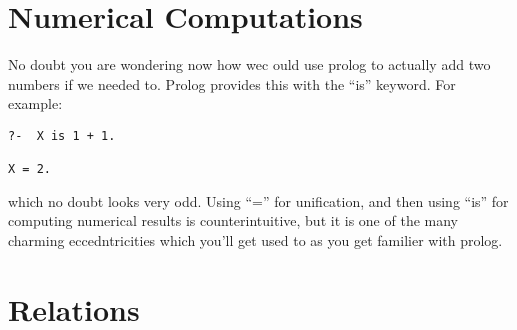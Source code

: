 \documentclass{book}[9pt]
\begin{document}
\section{Numerical Computations}

No doubt you are wondering now how wec ould use prolog to actually add
two numbers if we needed to.  Prolog provides this with the ``is'' keyword.  For example:
\begin{verbatim}
?-  X is 1 + 1.

X = 2.
\end{verbatim}
\noindent which no doubt looks very odd.  Using ``='' for unification, and then using
``is'' for computing numerical results is counterintuitive, but it is one of the many
charming eccedntricities which you'll get used to as you get familier with prolog.

\section{Relations}
\end{document}
